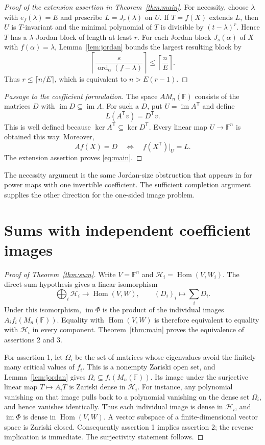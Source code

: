 \documentclass[11pt]{article}
\theoremstyle{remark}\newtheorem{remark}[theorem]{Remark}
\newcommand{\F}{\mathbb F}
\newcommand{\im}{\operatorname{im}}
\newcommand{\Hom}{\operatorname{Hom}}
\begin{document}
\begin{proof}[Proof of the extension assertion in Theorem~\ref{thm:main}]
For necessity, choose $\lambda$ with $e_f(\lambda)=E$ and prescribe $L=J_r(\lambda)$ on $U$. If $T=f(X)$ extends $L$, then $U$ is $T$-invariant and the minimal polynomial of $T$ is divisible by $(t-\lambda)^r$. Hence $T$ has a $\lambda$-Jordan block of length at least $r$. For each Jordan block $J_s(\alpha)$ of $X$ with $f(\alpha)=\lambda$, Lemma~\ref{lem:jordan} bounds the largest resulting block by
\[
 \left\lceil\frac{s}{\operatorname{ord}_{\alpha}(f-\lambda)}\right\rceil
 \le\left\lceil\frac nE\right\rceil.
\]
Thus $r\le\lceil n/E\rceil$, which is equivalent to $n>E(r-1)$.
\end{proof}

\begin{proof}[Passage to the coefficient formulation]
The space $AM_n(\F)$ consists of the matrices $D$ with $\im D\subseteq\im A$. For such a $D$, put $U=\im A^{\mathsf T}$ and define
\[
 L(A^{\mathsf T}v)=D^{\mathsf T}v.
\]
This is well defined because $\ker A^{\mathsf T}\subseteq\ker D^{\mathsf T}$. Every linear map $U\to\F^n$ is obtained this way. Moreover,
\[
 Af(X)=D\quad\Longleftrightarrow\quad
 f(X^{\mathsf T})|_U=L.
\]
The extension assertion proves \eqref{eq:main}.
\end{proof}

The necessity argument is the same Jordan-size obstruction that appears in \cite[Proposition 4.2]{SS} for power maps with one invertible coefficient. The sufficient completion argument supplies the other direction for the one-sided image problem.

\section{Sums with independent coefficient images}
\begin{proof}[Proof of Theorem~\ref{thm:sum}]
Write $V=\F^n$ and $\mathcal H_i=\Hom(V,W_i)$. The direct-sum hypothesis gives a linear isomorphism
\[
 \bigoplus_i\mathcal H_i\longrightarrow\Hom(V,W),
 \qquad(D_i)_i\longmapsto\sum_iD_i.
\]
Under this isomorphism, $\im\Phi$ is the product of the individual images $A_i f_i(M_n(\F))$. Equality with $\Hom(V,W)$ is therefore equivalent to equality with $\mathcal H_i$ in every component. Theorem~\ref{thm:main} proves the equivalence of assertions 2 and 3.

For assertion 1, let $\Omega_i$ be the set of matrices whose eigenvalues avoid the finitely many critical values of $f_i$. This is a nonempty Zariski open set, and Lemma~\ref{lem:jordan} gives $\Omega_i\subseteq f_i(M_n(\F))$. Its image under the surjective linear map $T\mapsto A_iT$ is Zariski dense in $\mathcal H_i$. For instance, any polynomial vanishing on that image pulls back to a polynomial vanishing on the dense set $\Omega_i$, and hence vanishes identically. Thus each individual image is dense in $\mathcal H_i$, and $\im\Phi$ is dense in $\Hom(V,W)$. A vector subspace of a finite-dimensional vector space is Zariski closed. Consequently assertion 1 implies assertion 2; the reverse implication is immediate. The surjectivity statement follows.
\end{proof}
\end{document}
